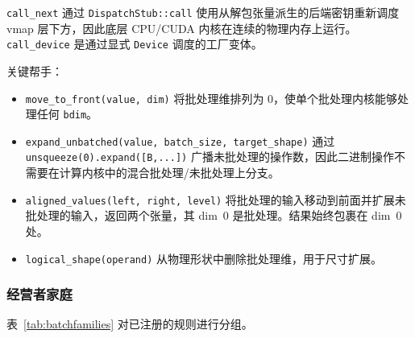 \texttt{call\_next} 通过 \texttt{DispatchStub::call} 使用从解包张量派生的后端密钥重新调度 vmap 层下方，因此底层 CPU/CUDA 内核在连续的物理内存上运行。 \texttt{call\_device} 是通过显式 \texttt{Device} 调度的工厂变体。

关键帮手：
\begin{itemize}[leftmargin=1.2em]
\item \texttt{move\_to\_front(value, dim)} 将批处理维排列为 0，使单个批处理内核能够处理任何 \texttt{bdim}。
\item \texttt{expand\_unbatched(value, batch\_size, target\_shape)} 通过 \texttt{unsqueeze(0).expand([B,...])} 广播未批处理的操作数，因此二进制操作不需要在计算内核中的混合批处理/未批处理上分支。
\item \texttt{aligned\_values(left, right, level)} 将批处理的输入移动到前面并扩展未批处理的输入，返回两个张量，其 dim~0 是批处理。结果始终包裹在 dim~0 处。
\item \texttt{logical\_shape(operand)} 从物理形状中删除批处理维，用于尺寸扩展。
\end{itemize}

\subsubsection{经营者家庭}

表~\ref{tab:batchfamilies} 对已注册的规则进行分组。

